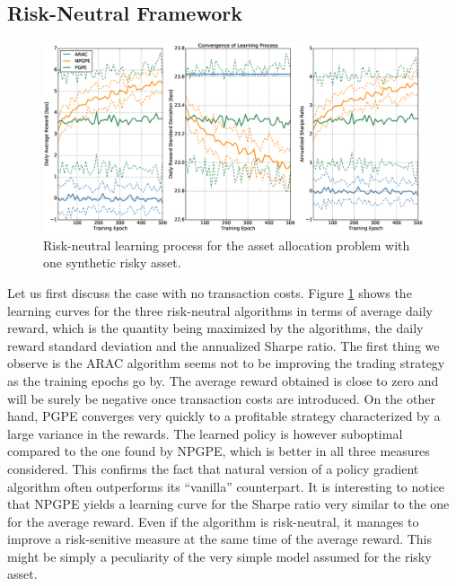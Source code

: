 \subsection{Risk-Neutral Framework}
\begin{figure}[t!]
	\centering
	\includegraphics[width=1.0\textwidth]{Images/6_0_single_synthetic_neutral_convergence}
	\caption[Risk-neutral learning process for one synthetic risky asset]{Risk-neutral learning process for the asset allocation problem with one synthetic risky asset.}
	\label{fig:single_synthetic_neutral_convergence}
\end{figure}
Let us first discuss the case with no transaction costs. Figure \ref{fig:single_synthetic_neutral_convergence} shows the learning curves for the three risk-neutral algorithms in terms of average daily reward, which is the quantity being maximized by the algorithms, the daily reward standard deviation and the annualized Sharpe ratio. The first thing we observe is the ARAC algorithm seems not to be improving the trading strategy as the training epochs go by. The average reward obtained is close to zero and will be surely be negative once transaction costs are introduced. On the other hand, PGPE converges very quickly to a profitable strategy characterized by a large variance in the rewards. The learned policy is however suboptimal compared to the one found by NPGPE, which is better in all three measures considered. This confirms the fact that natural version of a policy gradient algorithm often outperforms its ``vanilla'' counterpart. It is interesting to notice that NPGPE yields a learning curve for the Sharpe ratio very similar to the one for the average reward. Even if the algorithm is risk-neutral, it manages to improve a risk-senitive measure at the same time of the average reward. This might be simply a peculiarity of the very simple model assumed for the risky asset.\\ 
